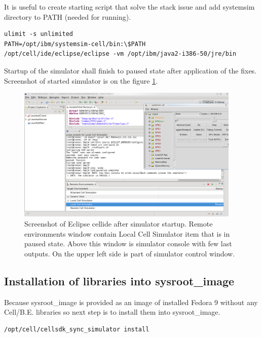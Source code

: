 It is useful to create starting script that solve the stack issue and add systemsim directory to PATH (needed for running).

\begin{verbatim}
ulimit -s unlimited
PATH=/opt/ibm/systemsim-cell/bin:\$PATH
/opt/cell/ide/eclipse/eclipse -vm /opt/ibm/java2-i386-50/jre/bin
\end{verbatim}

Startup of the simulator shall finish to paused state after application of the fixes.
Screenshot of started simulator is on the figure \ref{fg:eclipseSIMStarted}.

\begin{figure}
    \centering
    \includegraphics[width=0.95\textwidth]{data/png/eclipseSIMStarted}
    \caption[Cellide with started simulator]{Screenshot of Eclipse cellide after simulator startup. Remote environments window contain Local Cell Simulator item that is in paused state. Above this window is simulator console with few last outputs. On the upper left side is part of simulator control window.}
    \label{fg:eclipseSIMStarted}
\end{figure}

\subsection{Installation of libraries into sysroot\_image}

Because sysroot\_image is provided as an image of installed Fedora 9 without any \mbox{Cell/B.E.} libraries so next step is to install them into sysroot\_image.

\begin{verbatim}
/opt/cell/cellsdk_sync_simulator install
\end{verbatim}

